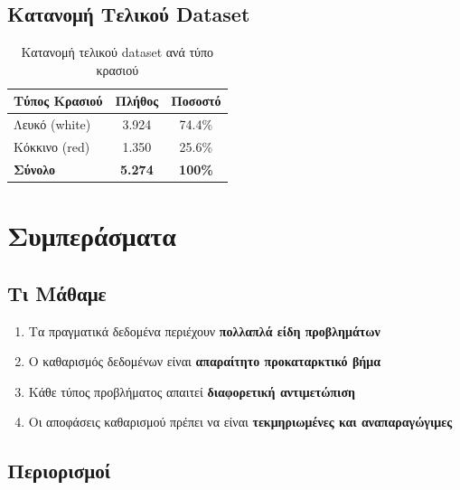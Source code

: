 \documentclass[12pt,a4paper]{article}
\begin{document}
\subsection{\textgreek{Κατανομή Τελικού Dataset}}

\begin{table}[H]
\centering
\caption{\textgreek{Κατανομή τελικού dataset ανά τύπο κρασιού}}
\begin{tabular}{@{}lcc@{}}
\toprule
\textbf{\textgreek{Τύπος Κρασιού}} & \textbf{\textgreek{Πλήθος}} & \textbf{\textgreek{Ποσοστό}} \\
\midrule
\textgreek{Λευκό (white)} & 3.924 & 74.4\% \\
\textgreek{Κόκκινο (red)} & 1.350 & 25.6\% \\
\midrule
\textbf{\textgreek{Σύνολο}} & \textbf{5.274} & \textbf{100\%} \\
\bottomrule
\end{tabular}
\end{table}

\section{\textgreek{Συμπεράσματα}}

\subsection{\textgreek{Τι Μάθαμε}}

\begin{enumerate}
    \item \textgreek{Τα πραγματικά δεδομένα περιέχουν} \textbf{\textgreek{πολλαπλά είδη προβλημάτων}}
    \item \textgreek{Ο καθαρισμός δεδομένων είναι} \textbf{\textgreek{απαραίτητο προκαταρκτικό βήμα}}
    \item \textgreek{Κάθε τύπος προβλήματος απαιτεί} \textbf{\textgreek{διαφορετική αντιμετώπιση}}
    \item \textgreek{Οι αποφάσεις καθαρισμού πρέπει να είναι} \textbf{\textgreek{τεκμηριωμένες και αναπαραγώγιμες}}
\end{enumerate}

\subsection{\textgreek{Περιορισμοί}}
\end{document}
